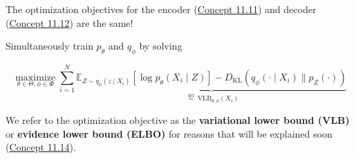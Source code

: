 \documentclass{report}
\begin{document}
\begin{definition}
    The optimization objectives for the encoder (\hyperref[concept:11.11]{Concept 11.11}) and decoder (\hyperref[concept:11.12]{Concept 11.12}) are the same!

    Simultaneously train $p_{\theta}$ and $q_{\phi}$ by solving

    $$
    \underset{\theta \in \Theta, \phi \in \Phi}{\operatorname{maximize}} \sum_{i=1}^{N} \underbrace{\mathbb{E}_{Z \sim q_{\phi}\left(z \mid X_{i}\right)}\left[\log p_{\theta}\left(X_{i} \mid Z\right)\right]-D_{\mathrm{KL}}\left(q_{\phi}\left(\cdot \mid X_{i}\right) \| p_{Z}(\cdot)\right)}_{\stackrel{\text { def }}{=} \mathrm{VLB}_{\theta, \phi}\left(X_{i}\right)}
    $$

    We refer to the optimization objective as the \textbf{variational lower bound (VLB)} or \textbf{evidence lower bound (ELBO)} for reasons that will be explained soon (\hyperref[concept:11.14]{Concept 11.14}).
\end{definition}
\end{document}
